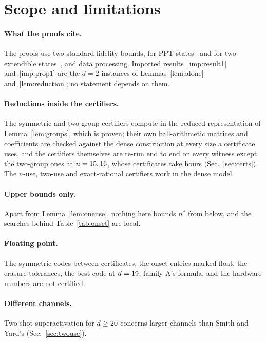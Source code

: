 \documentclass[aps,pra,twocolumn,superscriptaddress,nofootinbib,longbibliography,floatfix]{revtex4-2}
\begin{document}
\section{Scope and limitations}
\label{sec:scope}

\paragraph*{What the proofs cite.} The proofs use two standard fidelity bounds, for PPT states~\cite{horodecki1999general} and for two-extendible states~\cite{johnson2013compatible,kaur2019extendibility}, and data processing. Imported results~\ref{imp:result1} and~\ref{imp:prop1} are the $d=2$ instances of Lemmas~\ref{lem:alone} and~\ref{lem:reduction}; no statement depends on them.

\paragraph*{Reductions inside the certifiers.} The symmetric and two-group certifiers compute in the reduced representation of Lemma~\ref{lem:groups}, which is proven; their own ball-arithmetic matrices and coefficients are checked against the dense construction at every size a certificate uses, and the certifiers themselves are re-run end to end on every witness except the two-group ones at $n=15,16$, whose certificates take hours (Sec.~\ref{sec:certs}). The $n$-use, two-use and exact-rational certifiers work in the dense model.

\paragraph*{Upper bounds only.} Apart from Lemma~\ref{lem:oneuse}, nothing here bounds $n^*$ from below, and the searches behind Table~\ref{tab:onset} are local.

\paragraph*{Floating point.} The symmetric codes between certificates, the onset entries marked float, the erasure tolerances, the best code at $d=19$, family A's formula, and the hardware numbers are not certified.

\paragraph*{Different channels.} Two-shot superactivation for $d\ge20$ concerns larger channels than Smith and Yard's (Sec.~\ref{sec:twouse}).
\end{document}

